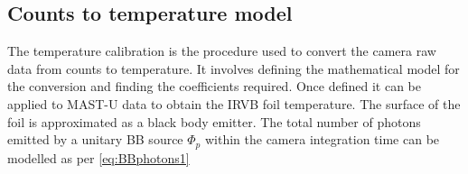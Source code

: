 

\subsection{Counts to temperature model}\label{Counts to temperature model}
The temperature calibration is the procedure used to convert the camera raw data from counts to temperature. It involves defining the mathematical model for the conversion and finding the coefficients required. Once defined it can be applied to MAST-U data to obtain the IRVB foil temperature.
The surface of the foil is approximated as a black body emitter. The total number of photons emitted by a unitary BB source ${\Phi}_p$ within the camera integration time can be modelled as per \autoref{eq:BBphotons1}


